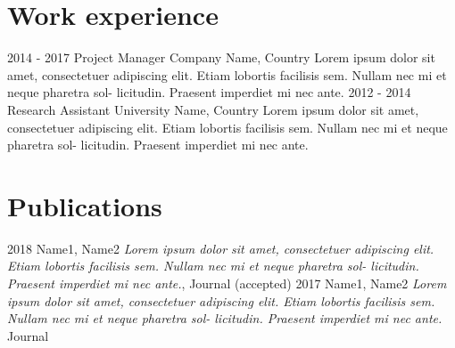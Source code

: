 \documentclass[11pt,a4paper]{smooth-banner-cv}
\begin{document}
\section{Work experience}

\begin{richlist}
\richlistitem
    {2014 - 2017}
    {Project Manager}
    {Company Name, Country}
    {Lorem ipsum dolor sit amet, consectetuer adipiscing elit. Etiam
      lobortis facilisis sem. Nullam nec mi et neque pharetra sol-
      licitudin. Praesent imperdiet mi nec ante.}
\richlistitem
    {2012 - 2014}
    {Research Assistant}
    {University Name, Country}
    {Lorem ipsum dolor sit amet, consectetuer adipiscing elit. Etiam
      lobortis facilisis sem. Nullam nec mi et neque pharetra sol-
      licitudin. Praesent imperdiet mi nec ante.}
\end{richlist}

\section{Publications}

\begin{simplelist}
   \simplelistitem
       {2018}
       {Name1, Name2 \newline
         \emph{Lorem ipsum dolor sit amet, consectetuer adipiscing elit. Etiam
          lobortis facilisis sem. Nullam nec mi et neque pharetra sol-
          licitudin. Praesent imperdiet mi nec ante.}, \newline Journal (accepted)}
    \simplelistitem
        {2017}
        {Name1, Name2 \newline\emph{Lorem ipsum dolor sit amet, consectetuer adipiscing elit. Etiam
          lobortis facilisis sem. Nullam nec mi et neque pharetra sol-
          licitudin. Praesent imperdiet mi nec ante.} \newline Journal}
\end{simplelist}


\newpage
\end{document}
